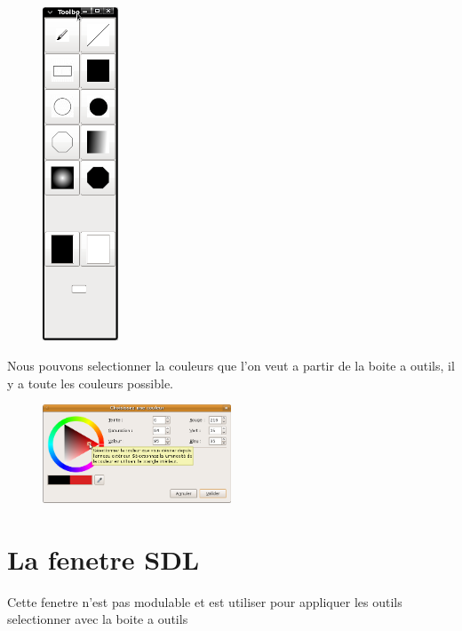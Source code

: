 \documentclass[12pt, a4paper]{report}
\begin{document}
\begin{figure}[!h]
\begin{center} \includegraphics[width=0.2\textwidth]{images/outil.png} \end{center}
\end{figure}

\newpage 

Nous pouvons selectionner la couleurs que l'on veut a partir de la boite a outils, il y a toute les couleurs possible.



\begin{figure}[!h]
\begin{center} \includegraphics[width=0.5\textwidth]{images/palette.png} \end{center}
\end{figure}


\section {La fenetre SDL}

Cette fenetre n'est pas modulable  et est utiliser pour appliquer les outils selectionner avec la boite a outils
\end{document}
